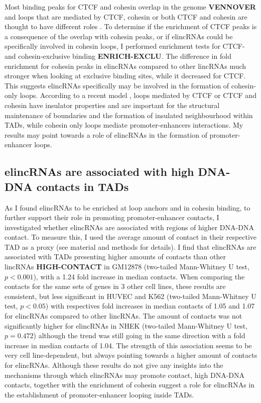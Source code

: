\documentclass[11pt,a4paper]{report}
\begin{document}
Most binding peaks for CTCF and cohesin overlap in the genome \textbf{VENNOVER} and loops that are mediated by CTCF, cohesin or both CTCF and cohesin are thought to have different roles \cite{Ji2016}⁠.  To determine if the enrichment of CTCF peaks is a consequence of the overlap with cohesin peaks, or if elincRNAs could be specifically involved in cohesin loops, I performed enrichment tests for CTCF- and cohesin-exclusive binding \textbf{ENRICH-EXCLU}. The difference in fold enrichment for cohesin peaks in elincRNAs compared to other lincRNAs much stronger when looking at exclusive binding sites, while it decreased for CTCF. This suggests elincRNAs specifically may be involved in the formation of cohesin-only loops. According to a recent model \cite{Ji2016}, loops mediated by CTCF or CTCF and cohesin have insulator properties and are important for the structural maintenance of boundaries and the formation of insulated neighbourhood within TADs, while cohesin only loops mediate promoter-enhancers interactions. My results may point towards a role of elincRNAs in the formation of promoter-enhancer loops.


\subsection*{elincRNAs are associated with high DNA-DNA contacts in TADs}

As I found elincRNAs to be enriched at loop anchors and in cohesin binding, to further support their role in promoting promoter-enhancer contacts,  I investigated whether elincRNAs are associated with regions of higher DNA-DNA contact. To measure this, I used the average amount of contact in their respective TAD as a proxy (see material and methods for details). I find that elincRNAs are associated with TADs presenting higher amounts of contacts than other lincRNAs \textbf{HIGH-CONTACT} in GM12878 (two-tailed Mann-Whitney U test, $p<0.001$), with a 1.24 fold increase in median contacts. When comparing the  contacts for the same sets of genes in 3 other cell lines, these results are consistent, but less significant in HUVEC and K562 (two-tailed Mann-Whitney U test, $p<0.05$) with respectives fold increases in median contacts of 1.05 and 1.07 for elincRNAs compared to other lincRNAs. The amount of contacts was not significantly higher for elincRNAs in NHEK (two-tailed Mann-Whitney U test, $p=0.472$) although the trend was still going in the same direction with a fold increase in median contacts of 1.04. 
The strength of this association seems to be very cell line-dependent, but always pointing towards a higher amount of contacts for elincRNAs. Although these results do not give any insights into the mechanisms through which elincRNAs may promote contact, high DNA-DNA contacts, together with the enrichment of cohesin suggest a role for elincRNAs in the establishment of promoter-enhancer looping inside TADs.
\end{document}
